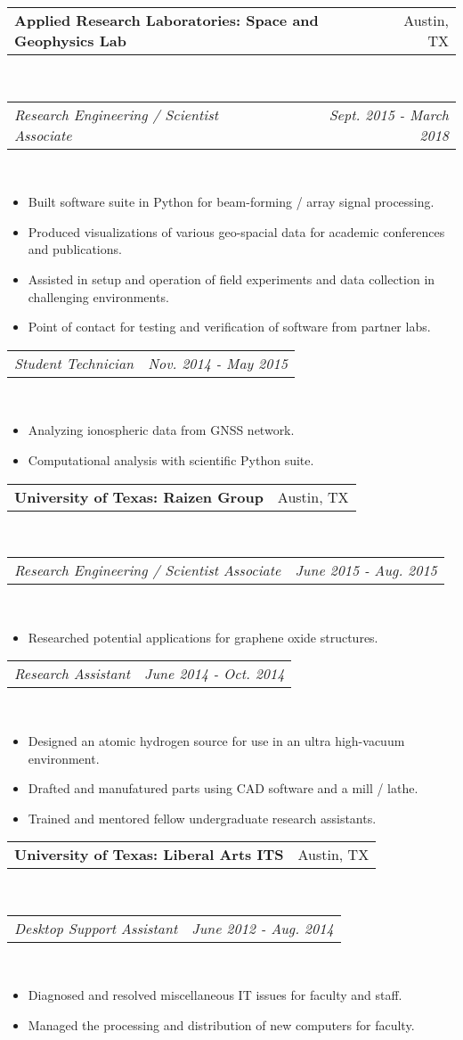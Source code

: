 \documentclass{article}
\makeatletter
\newcommand{\subheading}[2]{
	\begin{tabular*}{\textwidth}{l@{\extracolsep{\fill}}r}
		\textbf{#1} & #2 \\
	\end{tabular*} \\
}
\newcommand{\itemheading}[2]{
	\vspace{0.2em}
	\begin{tabular*}{\textwidth}{l@{\extracolsep{\fill}}r}
		\textit{#1} & \textit{#2} \\
	\end{tabular*} \\
	\vspace{-0.5em}
}
\makeatother
\begin{document}
\subheading{Applied Research Laboratories: Space and Geophysics Lab}{Austin, TX}
\itemheading{Research Engineering / Scientist Associate}{Sept. 2015 - March 2018}
\begin{itemize}
	\item Built software suite in Python for beam-forming / array signal processing.
	\item Produced visualizations of various geo-spacial data for academic conferences and publications.
	\item Assisted in setup and operation of field experiments and data collection in challenging environments.
	\item Point of contact for testing and verification of software from partner labs.
\end{itemize}
\itemheading{Student Technician}{Nov. 2014 - May 2015}
\begin{itemize}
	\item Analyzing ionospheric data from GNSS network.
	\item Computational analysis with scientific Python suite.
\end{itemize}

\subheading{University of Texas: Raizen Group}{Austin, TX}
\itemheading{Research Engineering / Scientist Associate}{June 2015 - Aug. 2015}
\begin{itemize}
	\item Researched potential applications for graphene oxide structures.
\end{itemize}
\itemheading{Research Assistant}{June 2014 - Oct. 2014}
\begin{itemize}
	\item Designed an atomic hydrogen source for use in an ultra high-vacuum environment.
	\item Drafted and manufatured parts using CAD software and a mill / lathe.
	\item Trained and mentored fellow undergraduate research assistants.
\end{itemize}

\subheading{University of Texas: Liberal Arts ITS}{Austin, TX}
\itemheading{Desktop Support Assistant}{June 2012 - Aug. 2014}
\begin{itemize}
	\item Diagnosed and resolved miscellaneous IT issues for faculty and staff.
	\item Managed the processing and distribution of new computers for faculty.
\end{itemize}
\end{document}
